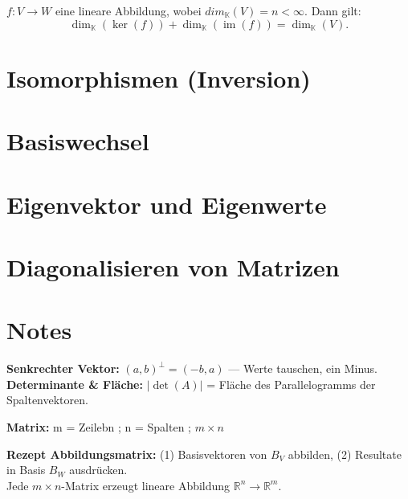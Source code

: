 \documentclass[10pt,a4paper,twocolumn]{article}
\newcommand{\seccol}{black}
\newcommand{\setseccol}[1]{\renewcommand{\seccol}{#1}}
\newcommand{\detail}[1]{{\small\color{detail}#1}}
\begin{document}
	\begin{tcolorbox}[defbox, title={Def. 7.1.3 — Rangsatz}]
		$f : V \to W$ eine lineare Abbildung, wobei $dim_{\mathbb{K}} (V ) = n < \infty$. Dann gilt:
		$$\dim_{\mathbb{K}} (\ker(f )) + \dim_{\mathbb{K}} (\operatorname{im}(f)) = \dim_{\mathbb{K}} (V ).$$
	\end{tcolorbox}
	
	\setseccol{c8}
	\section{Isomorphismen (Inversion)}
	
	\setseccol{c9}
	\section{Basiswechsel}
	
	\setseccol{c10}
	\section{Eigenvektor und Eigenwerte}
	
	\setseccol{c11}
	\section{Diagonalisieren von Matrizen}
	
	\setseccol{cn}
	\section{Notes}
	
	\detail{%
		\textbf{Senkrechter Vektor:} $(a,b)^\perp=(-b,a)$ — Werte tauschen, ein Minus.\\
		\textbf{Determinante \& Fläche:} $|\det(A)|$ = Fläche des Parallelogramms der Spaltenvektoren.\\
	}
	
	\detail{%
		\textbf{Matrix:} m = Zeilebn ; n = Spalten ; $m \times n$
	}
	
	\detail{%
		\textbf{Rezept Abbildungsmatrix:} (1) Basisvektoren von $B_V$ abbilden, (2) Resultate in Basis $B_W$ ausdrücken.\\
		Jede $m\times n$-Matrix erzeugt lineare Abbildung $\mathbb{R}^n\to\mathbb{R}^m$.%
	}
	
	
	
\end{document}
